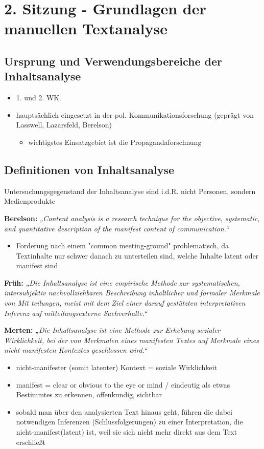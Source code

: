 \documentclass[11pt]{article}
\date{\today}
\title{}
\begin{document}
\tableofcontents

\section{2. Sitzung - Grundlagen der manuellen Textanalyse}
\label{sec:orgf37024e}
\subsection{Ursprung und Verwendungsbereiche der Inhaltsanalyse}
\label{sec:orge187f9a}
\begin{itemize}
\item 1. und 2. WK
\item hauptsächlich eingesetzt in der pol. Kommunikationsforschung (geprägt von Lasswell, Lazarsfeld, Berelson)
\begin{itemize}
\item wichtigstes Einsatzgebiet ist die Propagandaforschnung
\end{itemize}
\end{itemize}
\subsection{Definitionen von Inhaltsanalyse}
\label{sec:org2a5d45c}
Untersuchungsgegenstand der Inhaltsanalyse sind i.d.R. nicht Personen, sondern Medienprodukte

\textbf{Berelson:} \emph{„Content analysis is a research technique for the objective, systematic, and quantitative description of the manifest content of communication.“}
\begin{itemize}
\item Forderung nach einem "common meeting-ground" problematisch, da Textinhalte nur schwer danach zu unterteilen sind, welche Inhalte latent oder manifest sind
\end{itemize}

\textbf{Früh:} \emph{„Die Inhaltsanalyse ist eine empirische Methode zur systematischen, intersubjektiv nachvollziehbaren Beschreibung inhaltlicher und formaler Merkmale von Mit teilungen, meist mit dem Ziel einer darauf gestützten interpretativen Inferenz auf mitteilungsexterne Sachverhalte.“}

\textbf{Merten:} \emph{„Die Inhaltsanalyse ist eine Methode zur Erhebung sozialer Wirklichkeit, bei der von Merkmalen eines manifesten Textes auf Merkmale eines nicht-manifesten Kontextes geschlossen wird.“}
\begin{itemize}
\item nicht-manifester (somit latenter) Kontext = soziale Wirklichkeit
\item manifest = clear or obvious to the eye or mind / eindeutig als etwas Bestimmtes zu erkennen, offenkundig, sichtbar
\item sobald man über den analysierten Text hinaus geht, führen die dabei notwendigen Inferenzen (Schlussfolgerungen) zu einer Interpretation, die nicht-manifest(latent) ist, weil sie sich nicht mehr direkt aus dem Text erschließt
\end{itemize}
\end{document}
